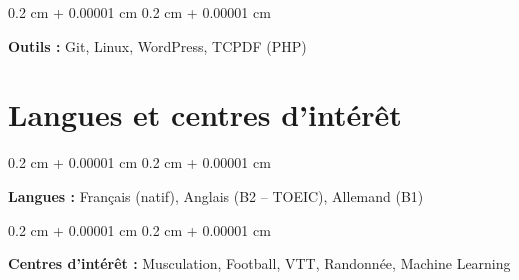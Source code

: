 \documentclass[10pt, letterpaper]{article}
\newenvironment{onecolentry}{
    \begin{adjustwidth}{
        0.2 cm + 0.00001 cm
    }{
        0.2 cm + 0.00001 cm
    }
}{
    \end{adjustwidth}
} %
\begin{document}
\vspace{0.2 cm}

\begin{onecolentry}
    \textbf{Outils :} Git, Linux, WordPress, TCPDF (PHP)
\end{onecolentry}

\section{Langues et centres d’intérêt}

\begin{onecolentry}
    \textbf{Langues :} Français (natif), Anglais (B2 – TOEIC), Allemand (B1)
\end{onecolentry}

\vspace{0.2 cm}

\begin{onecolentry}
    \textbf{Centres d’intérêt :} Musculation, Football, VTT, Randonnée, Machine Learning
\end{onecolentry}


\end{document}
